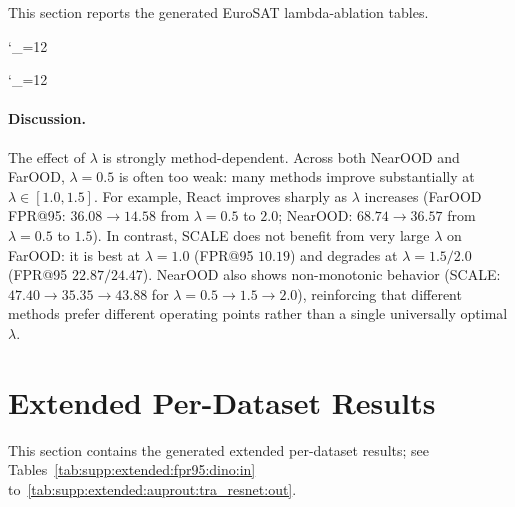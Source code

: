 \documentclass[runningheads]{llncs}
\begin{document}
This section reports the generated EuroSAT lambda-ablation tables.

\begin{table}[htbp]
  \centering
  \caption{EuroSAT in-domain (NearOOD) lambda ablation across teacher-guidance strengths $\lambda$.}
  \label{tab:supp:eurosat-lambda-ablation:nearood}
  \small
  \begingroup
  \catcode`\_=12\relax
  
  \endgroup
\end{table}

\begin{table}[htbp]
  \centering
  \caption{EuroSAT out-of-domain (FarOOD) lambda ablation across teacher-guidance strengths $\lambda$.}
  \label{tab:supp:eurosat-lambda-ablation:farood}
  \small
  \begingroup
  \catcode`\_=12\relax
  
  \endgroup
\end{table}

\paragraph{Discussion.}
The effect of $\lambda$ is strongly method-dependent. Across both NearOOD and FarOOD,
$\lambda{=}0.5$ is often too weak: many methods improve substantially at $\lambda\in[1.0,1.5]$.
For example, React improves sharply as $\lambda$ increases (FarOOD FPR@95: $36.08\rightarrow14.58$
from $\lambda{=}0.5$ to $2.0$; NearOOD: $68.74\rightarrow36.57$ from $\lambda{=}0.5$ to $1.5$).
In contrast, SCALE does not benefit from very large $\lambda$ on FarOOD: it is best at
$\lambda{=}1.0$ (FPR@95 $10.19$) and degrades at $\lambda{=}1.5/2.0$ (FPR@95 $22.87/24.47$).
NearOOD also shows non-monotonic behavior (SCALE: $47.40\rightarrow35.35\rightarrow43.88$
for $\lambda{=}0.5\rightarrow1.5\rightarrow2.0$), reinforcing that different methods prefer
different operating points rather than a single universally optimal $\lambda$.

\section{Extended Per-Dataset Results}
\label{sec:supp:extended-tables}

This section contains the generated extended per-dataset results; see Tables~\ref{tab:supp:extended:fpr95:dino:in} to~\ref{tab:supp:extended:auprout:tra_resnet:out}.
\end{document}
